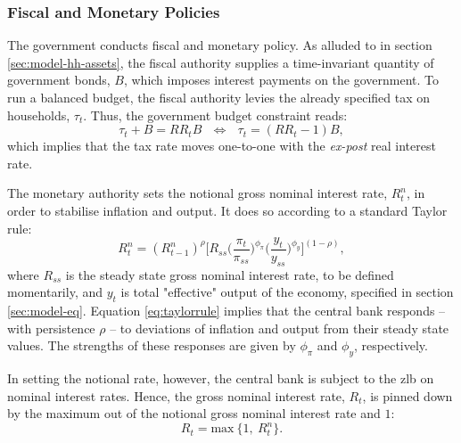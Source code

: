 \documentclass[a4paper,12pt]{article} %
\numberwithin{equation}{section} %
\numberwithin{figure}{section}
\numberwithin{table}{section}
\begin{document}
\subsubsection{Fiscal and Monetary Policies}
\label{sec:model-policy}

The government conducts fiscal and monetary policy. As alluded to in section \ref{sec:model-hh-assets}, the fiscal authority supplies a time-invariant quantity of government bonds, $B$, which imposes interest payments on the government. To run a balanced budget, the fiscal authority levies the already specified tax on households, $\tau_t$. Thus, the government budget constraint reads:
\begin{equation}
    \tau_t + B = RR_t B \ \ \ \Leftrightarrow \ \ \ \tau_t = (RR_t - 1)B, \label{eq:fiscal-budget}
\end{equation}
which implies that the tax rate moves one-to-one with the \textit{ex-post} real interest rate.

The monetary authority sets the notional gross nominal interest rate, $R_{t}^n$, in order to stabilise inflation and output. It does so according to a standard Taylor rule:
\begin{equation}
    R_{t}^n = ( R_{t-1}^n )^{\rho} \Bigg[ R_{ss} \Bigg( \frac{\pi_t}{\pi_{ss}} \Bigg)^{\phi_{\pi}} \Bigg( \frac{y_t}{y_{ss}} \Bigg)^{\phi_y} \Bigg]^{(1-\rho)}, \label{eq:taylorrule}
\end{equation}
where $R_{ss}$ is the steady state gross nominal interest rate, to be defined momentarily, and $y_t$ is total "effective" output of the economy, specified in section \ref{sec:model-eq}. Equation \eqref{eq:taylorrule} implies that the central bank responds -- with persistence $\rho$ -- to deviations of inflation and output from their steady state values. The strengths of these responses are given by $\phi_{\pi}$ and $\phi_y$, respectively. 

In setting the notional rate, however, the central bank is subject to the \Gls{zlb} on nominal interest rates. Hence, the gross nominal interest rate, $R_t$, is pinned down by the maximum out of the notional gross nominal interest rate and $1$: 
\begin{equation}
    R_t = \text{max} \ \{ 1, \ R_{t}^n \}. \label{eq:zlb}
\end{equation}

\end{document}
